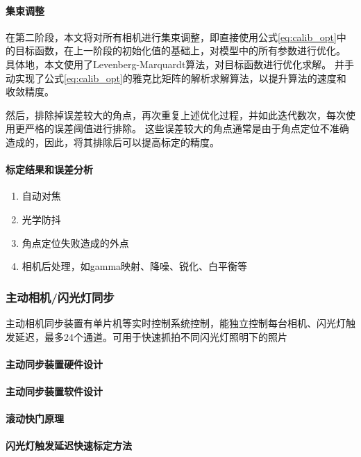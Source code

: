 \documentclass{ctexart}
\begin{document}
\paragraph{集束调整}在第二阶段，本文将对所有相机进行集束调整，即直接使用公式\eqref{eq:calib_opt}中的目标函数，在上一阶段的初始化值的基础上，对模型中的所有参数进行优化。
具体地，本文使用了Levenberg-Marquardt算法\cite{lm}，对目标函数进行优化求解。
并手动实现了公式\eqref{eq:calib_opt}的雅克比矩阵的解析求解算法，以提升算法的速度和收敛精度。

然后，排除掉误差较大的角点，再次重复上述优化过程，并如此迭代数次，每次使用更严格的误差阈值进行排除。
这些误差较大的角点通常是由于角点定位不准确造成的，因此，将其排除后可以提高标定的精度。

\paragraph{标定结果和误差分析}

\begin{enumerate}
    \item 自动对焦
    \item 光学防抖
    \item 角点定位失败造成的外点
    \item 相机后处理，如gamma映射、降噪、锐化、白平衡等
\end{enumerate}

\subsubsection{主动相机/闪光灯同步}

主动相机同步装置有单片机等实时控制系统控制，能独立控制每台相机、闪光灯触发延迟，最多24个通道。可用于快速抓拍不同闪光灯照明下的照片

\paragraph{主动同步装置硬件设计}

\paragraph{主动同步装置软件设计}

\paragraph{滚动快门原理}

\paragraph{闪光灯触发延迟快速标定方法}
\end{document}
